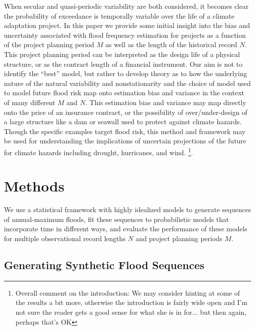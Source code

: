 \documentclass[12pt]{article}
\begin{document}
When secular and quasi-periodic variability are both considered, it becomes clear the probability of exceedance is temporally variable over the life of a climate adaptation project.
In this paper we provide some initial insight into the bias and uncertainty associated with flood frequency estimation for projects as a function of the project planning period $M$ as well as the length of the historical record $N$.
This project planning period can be interpreted as the design life of a physical structure, or as the contract length of a financial instrument.
Our aim is not to identify the ``best'' model, but rather to develop theory as to how the underlying nature of the natural variability and nonstationarity and the choice of model used to model future flood risk map onto estimation bias and variance in the context of many different $M$ and $N$.
This estimation bias and variance may map directly onto the price of an insurance contract, or the possibility of over/under-design of a large structure like a dam or seawall used to protect against climate hazards.
Though the specific examples target flood risk, this method and framework may be used for understanding the implications of uncertain projections of the future for climate hazards including drought, hurricanes, and wind. \footnote{Overall comment on the introduction:  We may consider hinting at some of the results a bit more, otherwise the introduction is fairly wide open and I'm not sure the reader gets a good sense for what she is in for... but then again, perhaps that's OK}.


\section{Methods}\label{sec:methods}

We use a statistical framework with highly idealized models to generate sequences of annual-maximum floods, fit these sequences to probabilistic models that incorporate time in different ways, and evaluate the performance of these models for multiple observational record lengths $N$ and project planning periods $M$.

\subsection{Generating Synthetic Flood Sequences\label{sec:methods-generating}}
\end{document}
